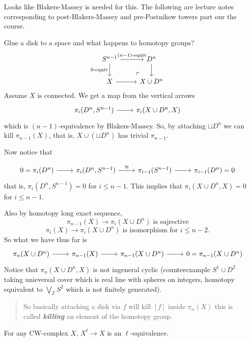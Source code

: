 {\color{cyan}Looks like Blakers-Massey is needed for this. The following are lecture notes corresponding to post-Blakers-Massey and pre-Postnikow towers part our the course.}

Glue a disk to a space and what happens to homotopy groups?
\[\begin{tikzcd}
	S^{n-1}\arrow[r,"(n-1)\text{-equiv}"]\arrow[d,"0\text{-equiv}",swap]&D^n\arrow[d]\\
	X\arrow[r]&X\cup D^n\arrow[ul, phantom, "\ulcorner", very near start]
\end{tikzcd}\]
Assume $X$ is connected. We get a map from the vertical arrows
\[\begin{tikzcd}
	\pi_i(D^n,S^{n-1})\arrow[r]&\pi_i(X\cup D^n,X)
\end{tikzcd}\]
which is $(n-1)$-equivalence by Blakers-Massey. So, by attaching $\sqcup D^n$ we can kill $\pi_{n-1}(X)$, that is, $X\cup(\sqcup D^n)$ has trivial $\pi_{n-1}$.

Now notice that

\[\begin{tikzcd}
	0=\pi_i(D^n)\arrow[r]&\pi_i(D^n,S^{n-1})\arrow[r,"\cong"]&\pi_{i-1}(S^{n-1})\arrow[r]&\pi_{i-1}(D^n)=0
\end{tikzcd}\]
that is, $\pi_i(D^n,S^{n-1})=0$ for $i\leq n-1$. This implies that $\pi_i(X\cup D^n,X)=0$ for $i\leq n-1$.

Also by homotopy long exact sequence,
\[\pi_{n-1}(X)\to \pi_i(X\cup D^n)\text{ is sujrective}\]
\[\pi_i(X)\to \pi_{i}(X\cup D^n)\text{ is isomorphism for }i\leq n-2.\]
So what we have thus far is
\[\begin{tikzcd}
	\pi_n(X\cup D^n)\arrow[r]&\pi_{n-1}(X)\arrow[r]&\pi_{n-1}(X\cup D^n)\arrow[r]&0=\pi_{n-1}(X\cup D^n)
\end{tikzcd}\]
Notice that $\pi_n(X\cup D^n,X)$ is not ingeneral cyclic (counterexample $S^1\cup D^2$ taking unieversal cover which is real line with spheres on integers, homotopy equivalent to $\bigvee_\mathbb{Z} S^2$ which is not finitely generated).

\begin{quote}
	{\color{red} So basically attaching a disk via $f$ will kill $[f]$ inside $\pi_n(X)$ this is called \textbf{\textit{killing}} an element of the homotopy group.}
\end{quote}

\begin{prop}
	For any CW-complex $X$, $X^\ell\to X$ is an $\ell$-equivalence.
\end{prop}

